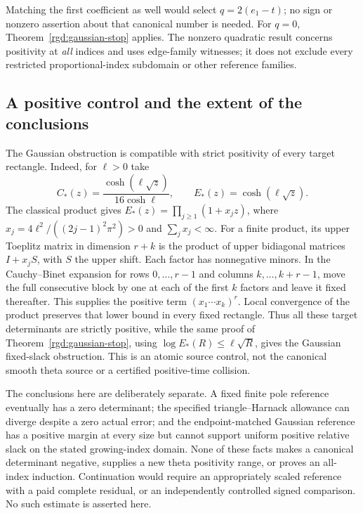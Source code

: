 Matching the first coefficient as well would select $q=2(e_1-t)$;
no sign or nonzero assertion about that canonical number is needed.
For $q=0$, Theorem~\ref{rgd:gaussian-stop} applies.  The nonzero
quadratic result concerns positivity at \emph{all} indices and uses
edge-family witnesses; it does not exclude every restricted
proportional-index subdomain or other reference families.

\subsection{A positive control and the extent of the conclusions}

The Gaussian obstruction is compatible with strict positivity of every
target rectangle.  Indeed, for $\ell>0$ take
\[
 C_*(z)=\frac{\cosh(\ell\sqrt z)}{16\cosh\ell},\qquad
 E_*(z)=\cosh(\ell\sqrt z).
\]
The classical product \cite[Eq.~4.36.2]{NISTDLMFPositiveThetaPrimitives}
gives $E_*(z)=\prod_{j\ge1}(1+x_jz)$, where
$x_j=4\ell^2/((2j-1)^2\pi^2)>0$ and $\sum_jx_j<\infty$.
For a finite product, its upper Toeplitz matrix in dimension $r+k$ is
the product of upper bidiagonal matrices $I+x_jS$, with $S$ the upper
shift.  Each factor has nonnegative minors.  In the Cauchy--Binet
expansion for rows $0,\ldots,r-1$ and columns $k,\ldots,k+r-1$,
move the full consecutive block by one at each of the first $k$
factors and leave it fixed thereafter.  This supplies the positive
term $(x_1\cdots x_k)^r$.  Local convergence of the product preserves
that lower bound in every fixed rectangle.  Thus all these target
determinants are strictly positive, while the same proof of
Theorem~\ref{rgd:gaussian-stop}, using
$\log E_*(R)\le\ell\sqrt R$, gives the Gaussian fixed-slack obstruction.
This is an atomic source control, not the canonical smooth theta source
or a certified positive-time collision.

The conclusions here are deliberately separate.  A fixed finite pole
reference eventually has a zero determinant; the specified
triangle--Harnack allowance can diverge despite a zero actual error;
and the endpoint-matched Gaussian reference has a positive margin at
every size but cannot support uniform positive relative slack on the
stated growing-index domain.  None of these facts makes a canonical
determinant negative, supplies a new theta positivity range, or proves
an all-index induction.  Continuation would require an appropriately
scaled reference with a paid complete residual, or an independently
controlled signed comparison.  No such estimate is asserted here.

